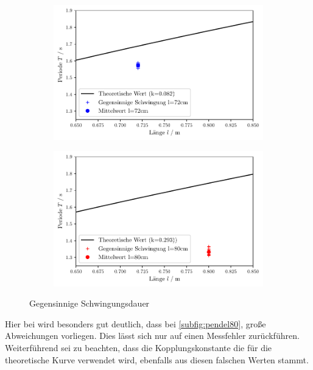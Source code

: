 \begin{figure}
    \begin{subfigure}[c]{0.5\textwidth}
        \includegraphics[width=\textwidth]{plots/plot2.pdf}
    \end{subfigure}
    \begin{subfigure}[c]{0.5\textwidth}
        \includegraphics[width=\textwidth]{plots/plot3.pdf}
        \label{subfig:pedel80}
    \end{subfigure}
    \caption{Gegensinnige Schwingungsdauer}
\end{figure}

Hier bei wird besonders gut deutlich, dass bei \ref{subfig:pendel80}, große Abweichungen
vorliegen. Dies lässt sich nur auf einen Messfehler zurückführen.
Weiterführend sei zu beachten, dass die Kopplungskonstante die für die theoretische Kurve
verwendet wird, ebenfalls aus diesen falschen Werten stammt.

